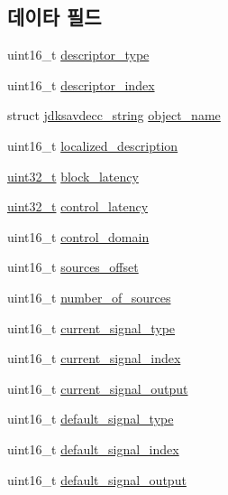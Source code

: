 \subsection*{데이타 필드}
\begin{DoxyCompactItemize}
\item 
uint16\+\_\+t \hyperlink{structjdksavdecc__descriptor__signal__selector_ab7c32b6c7131c13d4ea3b7ee2f09b78d}{descriptor\+\_\+type}
\item 
uint16\+\_\+t \hyperlink{structjdksavdecc__descriptor__signal__selector_a042bbc76d835b82d27c1932431ee38d4}{descriptor\+\_\+index}
\item 
struct \hyperlink{structjdksavdecc__string}{jdksavdecc\+\_\+string} \hyperlink{structjdksavdecc__descriptor__signal__selector_a7d1f5945a13863b1762fc6db74fa8f80}{object\+\_\+name}
\item 
uint16\+\_\+t \hyperlink{structjdksavdecc__descriptor__signal__selector_a0926f846ca65a83ad5bb06b4aff8f408}{localized\+\_\+description}
\item 
\hyperlink{parse_8c_a6eb1e68cc391dd753bc8ce896dbb8315}{uint32\+\_\+t} \hyperlink{structjdksavdecc__descriptor__signal__selector_ae2e9f0088d5e900b610d1b2818dfc559}{block\+\_\+latency}
\item 
\hyperlink{parse_8c_a6eb1e68cc391dd753bc8ce896dbb8315}{uint32\+\_\+t} \hyperlink{structjdksavdecc__descriptor__signal__selector_ab2bd4639caaf9a8078b68368afbd63b6}{control\+\_\+latency}
\item 
uint16\+\_\+t \hyperlink{structjdksavdecc__descriptor__signal__selector_a8937b22996b7c28ae209f29fe777f03a}{control\+\_\+domain}
\item 
uint16\+\_\+t \hyperlink{structjdksavdecc__descriptor__signal__selector_ac9ce4e1b642e6654d49504898dbe738d}{sources\+\_\+offset}
\item 
uint16\+\_\+t \hyperlink{structjdksavdecc__descriptor__signal__selector_a1af3a7f3729937d5da218737ba5b2483}{number\+\_\+of\+\_\+sources}
\item 
uint16\+\_\+t \hyperlink{structjdksavdecc__descriptor__signal__selector_a408475bffcd6570a3f9765640a6295fc}{current\+\_\+signal\+\_\+type}
\item 
uint16\+\_\+t \hyperlink{structjdksavdecc__descriptor__signal__selector_a4212c1f7128d45c03128f227a8c006ea}{current\+\_\+signal\+\_\+index}
\item 
uint16\+\_\+t \hyperlink{structjdksavdecc__descriptor__signal__selector_a5dc47fe67773594e0c97e7002f30dcdf}{current\+\_\+signal\+\_\+output}
\item 
uint16\+\_\+t \hyperlink{structjdksavdecc__descriptor__signal__selector_a18ece2e97b4c992cddf6d79fea5de625}{default\+\_\+signal\+\_\+type}
\item 
uint16\+\_\+t \hyperlink{structjdksavdecc__descriptor__signal__selector_ab4a3878d07f400df446a3b86c017d70c}{default\+\_\+signal\+\_\+index}
\item 
uint16\+\_\+t \hyperlink{structjdksavdecc__descriptor__signal__selector_aec79d305cd36498cff43ccd72909c13f}{default\+\_\+signal\+\_\+output}
\end{DoxyCompactItemize}


